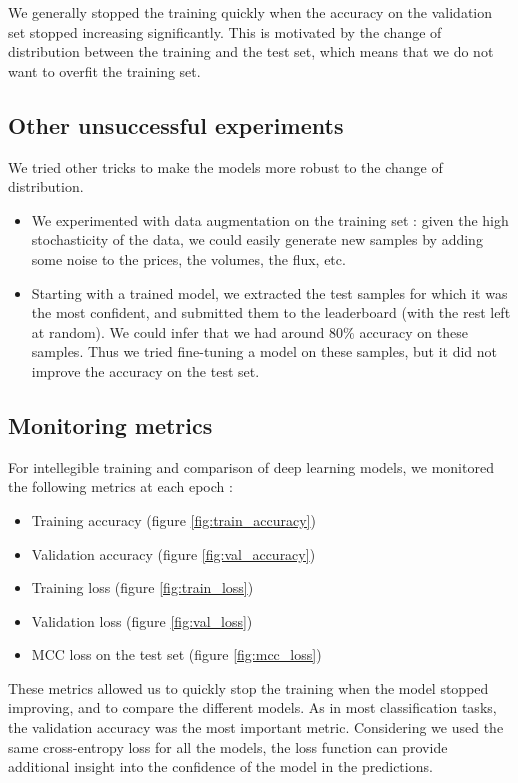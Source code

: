 \documentclass[switch, 11pt]{article}
\begin{document}
\begin{multicols}{2}
    We generally stopped the training quickly when the accuracy on the validation set stopped increasing significantly. This is motivated by the change of distribution between the training and the test set, which means that we do not want to overfit the training set.

    \subsection{Other unsuccessful experiments}

    We tried other tricks to make the models more robust to the change of distribution.
    \begin{itemize}
        \item We experimented with data augmentation on the training set : given the high stochasticity of the data, we could easily generate new samples by adding some noise to the prices, the volumes, the flux, etc.
        \item Starting with a trained model, we extracted the test samples for which it was the most confident, and submitted them to the leaderboard (with the rest left at random). We could infer that we had around $80\%$ accuracy on these samples. Thus we tried fine-tuning a model on these samples, but it did not improve the accuracy on the test set.
    \end{itemize}

    \subsection{Monitoring metrics}

    For intellegible training and comparison of deep learning models, we monitored the following metrics at each epoch :
    \begin{itemize}
        \item Training accuracy (figure \ref{fig:train_accuracy})
        \item Validation accuracy (figure \ref{fig:val_accuracy})
        \item Training loss (figure \ref{fig:train_loss})
        \item Validation loss (figure \ref{fig:val_loss})
        \item MCC loss on the test set (figure \ref{fig:mcc_loss})
    \end{itemize}

    These metrics allowed us to quickly stop the training when the model stopped improving, and to compare the different models. As in most classification tasks, the validation accuracy was the most important metric. Considering we used the same cross-entropy loss for all the models, the loss function can provide additional insight into the confidence of the model in the predictions.


\end{multicols}
\end{document}
